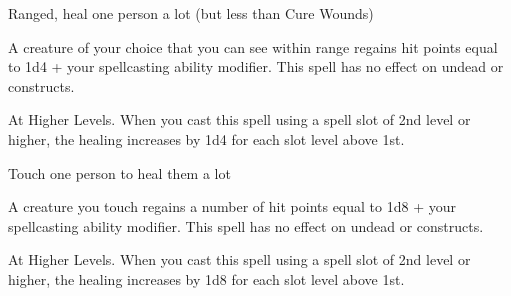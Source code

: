 \documentclass{article}
\begin{document}
\begin{spellcategory}

    \begin{spell}
        \begin{spellusage}
            Ranged, heal one person a lot (but less than Cure Wounds)
        \end{spellusage}
        \begin{spelldescription}
            A creature of your choice that you can see within range regains hit
            points equal to 1d4 + your spellcasting ability modifier. This spell
            has no effect on undead or constructs.

            At Higher Levels. When you cast this spell using a spell slot of
            2nd level or higher, the healing increases by 1d4 for each slot
            level above 1st.
        \end{spelldescription}
    \end{spell}

    \begin{spell}
        \begin{spellusage}
            Touch one person to heal them a lot
        \end{spellusage}
        \begin{spelldescription}
            A creature you touch regains a number of hit points equal to 1d8 +
            your spellcasting ability modifier. This spell has no effect on
            undead or constructs.

            At Higher Levels. When you cast this spell using a spell slot of
            2nd level or higher, the healing increases by 1d8 for each slot
            level above 1st.
        \end{spelldescription}
    \end{spell}
\end{spellcategory}

\spellreference
\end{document}

